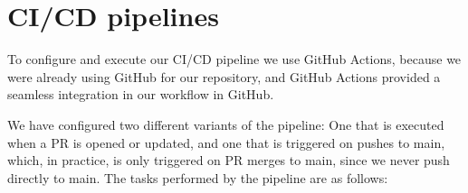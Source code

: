 \section{CI/CD pipelines}
To configure and execute our CI/CD pipeline we use GitHub Actions, because we were already using GitHub for our repository, and GitHub Actions provided a seamless integration in our workflow in GitHub. %

We have configured two different variants of the pipeline: One that is executed when a PR is opened or updated, and one that is triggered on pushes to main, which, in practice, is only triggered on PR merges to main, since we never push directly to main. The tasks performed by the pipeline are as follows:

